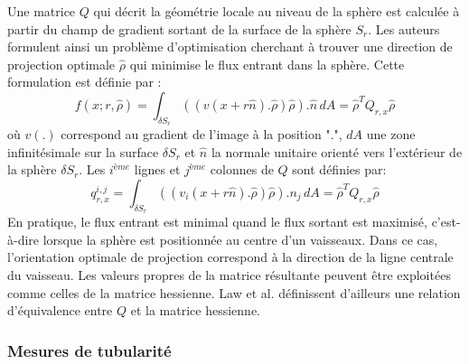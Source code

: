   Une matrice $Q$ qui décrit la géométrie locale au niveau de la sphère est calculée à partir du champ de gradient sortant de la surface de la sphère $S_r$. Les auteurs formulent ainsi un problème d'optimisation cherchant à trouver une direction de projection optimale  $\widehat{\rho}$ qui minimise le flux entrant dans la sphère. Cette formulation est définie par :
\begin{equation}
    f(x;r, \widehat{\rho} )= \int_{\delta S_r} (( v(x + r\widehat{n}).\widehat{\rho})\widehat{\rho}). \widehat{n}\,dA = \widehat{\rho}^{T}Q_{r,x}\widehat{\rho}  	\nonumber
\end{equation}
où $v(.)$ correspond au gradient de l'image à la position ".", $dA$ une zone infinitésimale sur la surface $\delta S_r$ et $\widehat{n}$ la normale unitaire orienté vers l'extérieur de la sphère $\delta S_r$.
Les $i^{ème}$ lignes et $j^{ème}$ colonnes de $Q$ sont définies par: 
\begin{equation}
    q_{r,x}^{i,j} = \int_{\delta S_r} (( v_i(x + r\widehat{n}).\widehat{\rho})\widehat{\rho}).n_j\,dA = \widehat{\rho}^{T}Q_{r,x}\widehat{\rho}  \nonumber	
\end{equation}
En pratique, le flux entrant est minimal quand le flux sortant est maximisé, c'est-à-dire lorsque la sphère est positionnée au centre d'un vaisseaux. Dans ce cas, l'orientation optimale de projection correspond à la direction de la ligne centrale du vaisseau. Les valeurs propres de la matrice résultante peuvent être exploitées comme celles de la matrice hessienne. Law et al. \cite{Law2008_OOF} définissent d'ailleurs une relation d'équivalence entre $Q$ et la matrice hessienne.


\subsubsection{Mesures de tubularité}
\label{sec:mesure_tubularity}


